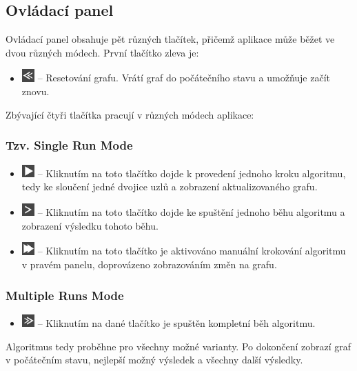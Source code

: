 \documentclass[../projekt.tex]{subfiles}
\begin{document}
\subsection{Ovládací panel}

Ovládací panel obsahuje pět různých tlačítek, přičemž aplikace může běžet
ve dvou různých módech. První tlačítko zleva je:  

\begin{itemize}
    \item[] \includegraphics[height=1.3em]{obrazky-figures/resetSmall.png} -- Resetování grafu.
    Vrátí graf do počátečního stavu a umožňuje začít znovu. 
\end{itemize}

\newpage

\noindent Zbývající čtyři tlačítka pracují v různých módech aplikace:

\subsubsection {Tzv. Single Run Mode}

\begin{itemize}
    \item[] \includegraphics[height=1.3em]{obrazky-figures/playSmall.png} -- Kliknutím na toto tlačítko dojde k provedení jednoho kroku algoritmu, tedy ke sloučení jedné dvojice uzlů a zobrazení aktualizovaného grafu.
    \item[] \includegraphics[height=1.3em]{obrazky-figures/nextStepSmall.png} -- Kliknutím na toto tlačítko dojde ke spuštění jednoho běhu algoritmu a zobrazení výsledku tohoto běhu.
    \item[] \includegraphics[height=1.3em]{obrazky-figures/manualSteps.png} -- Kliknutím na toto tlačítko je aktivováno manuální krokování algoritmu v pravém panelu, doprovázeno zobrazováním změn na grafu.
\end{itemize}

\subsubsection{Multiple Runs Mode}

\begin{itemize}
	\item[] \includegraphics[height=1.3em]{obrazky-figures/finishSmall.png} -- Kliknutím na dané tlačítko je spuštěn kompletní běh algoritmu.
\end{itemize}
Algoritmus tedy proběhne pro všechny možné varianty. Po dokončení zobrazí graf v počátečním stavu, nejlepší možný výsledek a všechny další výsledky.
\end{document}
